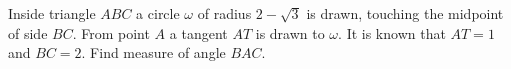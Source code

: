 Inside triangle $ABC$ a circle $\omega$ of radius $2-\sqrt{3}$ is drawn, touching the midpoint of side $BC$. From point $A$ a tangent $AT$ is drawn to $\omega$. It is known that $AT=1$ and $BC=2$. Find measure of angle $BAC$.
